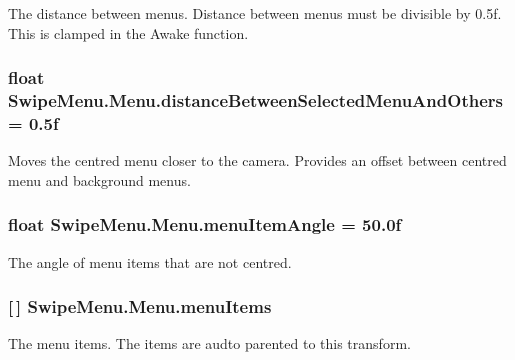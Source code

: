 The distance between menus. Distance between menus must be divisible by 0.\+5f. This is clamped in the Awake function. 

\hypertarget{class_swipe_menu_1_1_menu_a2b2fcb8ac09988c22e2e38a43495fd93}{}
\subsubsection[{distance\+Between\+Selected\+Menu\+And\+Others}]{\setlength{\rightskip}{0pt plus 5cm}float Swipe\+Menu.\+Menu.\+distance\+Between\+Selected\+Menu\+And\+Others = 0.\+5f}\label{class_swipe_menu_1_1_menu_a2b2fcb8ac09988c22e2e38a43495fd93}


Moves the centred menu closer to the camera. Provides an offset between centred menu and background menus. 

\hypertarget{class_swipe_menu_1_1_menu_a8ad641c029ba5597d87ced951e5d8e4b}{}
\subsubsection[{menu\+Item\+Angle}]{\setlength{\rightskip}{0pt plus 5cm}float Swipe\+Menu.\+Menu.\+menu\+Item\+Angle = 50.\+0f}\label{class_swipe_menu_1_1_menu_a8ad641c029ba5597d87ced951e5d8e4b}


The angle of menu items that are not centred. 

\hypertarget{class_swipe_menu_1_1_menu_ac05bfc6ab9e0d2655d17fda6bdc7bbf7}{}
\subsubsection[{menu\+Items}]{ \mbox{[}$\,$\mbox{]} Swipe\+Menu.\+Menu.\+menu\+Items}\label{class_swipe_menu_1_1_menu_ac05bfc6ab9e0d2655d17fda6bdc7bbf7}


The menu items. The items are audto parented to this transform. 

